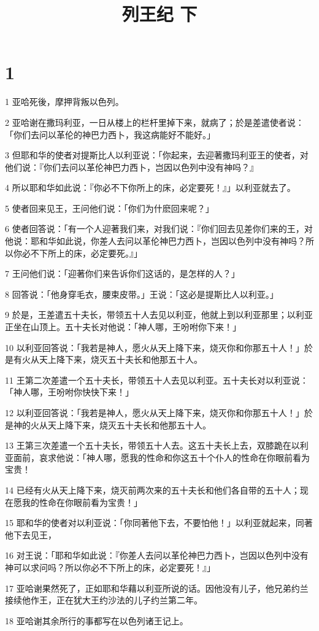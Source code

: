 

\title{列王纪 下}


\chapter{1}

\par 1 亚哈死後，摩押背叛以色列。
\par 2 亚哈谢在撒玛利亚，一日从楼上的栏杆里掉下来，就病了；於是差遣使者说：「你们去问以革伦的神巴力西卜，我这病能好不能好。」
\par 3 但耶和华的使者对提斯比人以利亚说：「你起来，去迎著撒玛利亚王的使者，对他们说：『你们去问以革伦神巴力西卜，岂因以色列中没有神吗？』
\par 4 所以耶和华如此说：『你必不下你所上的床，必定要死！』」以利亚就去了。
\par 5 使者回来见王，王问他们说：「你们为什麽回来呢？」
\par 6 使者回答说：「有一个人迎著我们来，对我们说：『你们回去见差你们来的王，对他说：耶和华如此说，你差人去问以革伦神巴力西卜，岂因以色列中没有神吗？所以你必不下所上的床，必定要死。』」
\par 7 王问他们说：「迎著你们来告诉你们这话的，是怎样的人？」
\par 8 回答说：「他身穿毛衣，腰束皮带。」王说：「这必是提斯比人以利亚。」
\par 9 於是，王差遣五十夫长，带领五十人去见以利亚，他就上到以利亚那里；以利亚正坐在山顶上。五十夫长对他说：「神人哪，王吩咐你下来！」
\par 10 以利亚回答说：「我若是神人，愿火从天上降下来，烧灭你和你那五十人！」於是有火从天上降下来，烧灭五十夫长和他那五十人。
\par 11 王第二次差遣一个五十夫长，带领五十人去见以利亚。五十夫长对以利亚说：「神人哪，王吩咐你快快下来！」
\par 12 以利亚回答说：「我若是神人，愿火从天上降下来，烧灭你和你那五十人！」於是神的火从天上降下来，烧灭五十夫长和他那五十人。
\par 13 王第三次差遣一个五十夫长，带领五十人去。这五十夫长上去，双膝跪在以利亚面前，哀求他说：「神人哪，愿我的性命和你这五十个仆人的性命在你眼前看为宝贵！
\par 14 已经有火从天上降下来，烧灭前两次来的五十夫长和他们各自带的五十人；现在愿我的性命在你眼前看为宝贵！」
\par 15 耶和华的使者对以利亚说：「你同著他下去，不要怕他！」以利亚就起来，同著他下去见王，
\par 16 对王说：「耶和华如此说：『你差人去问以革伦神巴力西卜，岂因以色列中没有神可以求问吗？所以你必不下所上的床，必定要死！』」
\par 17 亚哈谢果然死了，正如耶和华藉以利亚所说的话。因他没有儿子，他兄弟约兰接续他作王，正在犹大王约沙法的儿子约兰第二年。
\par 18 亚哈谢其余所行的事都写在以色列诸王记上。

